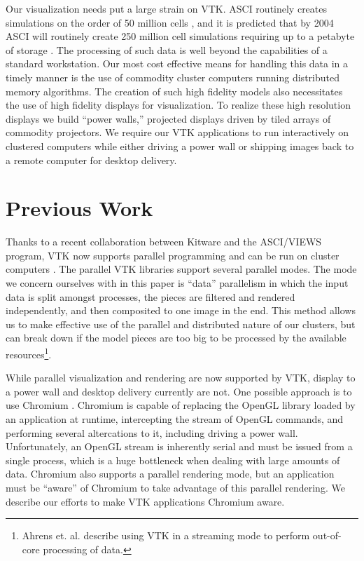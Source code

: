 \documentclass[twocolumn]{article}
\begin{document}
  Our visualization needs put a large strain on VTK.  ASCI routinely
  creates simulations on the order of 50 million cells \cite{Heermann99},
  and it is predicted that by 2004 ASCI will routinely create 250 million
  cell simulations requiring up to a petabyte of storage \cite{Smith98}.
  The processing of such data is well beyond the capabilities of a standard
  workstation.  Our most cost effective means for handling this data in a
  timely manner is the use of commodity cluster computers running
  distributed memory algorithms.  The creation of such high fidelity models
  also necessitates the use of high fidelity displays for visualization.
  To realize these high resolution displays we build ``power walls,''
  projected displays driven by tiled arrays of commodity projectors.  We
  require our VTK applications to run interactively on clustered computers
  while either driving a power wall or shipping images back to a remote
  computer for desktop delivery.


  \section{Previous Work}
  \label{sec:previous_work}

  Thanks to a recent collaboration between Kitware and the ASCI/VIEWS
  program, VTK now supports parallel programming and can be run on cluster
  computers \cite{Ahrens00}.  The parallel VTK libraries support several
  parallel modes.  The mode we concern ourselves with in this paper is
  ``data'' parallelism in which the input data is split amongst processes,
  the pieces are filtered and rendered independently, and then composited
  to one image in the end.  This method allows us to make effective use of
  the parallel and distributed nature of our clusters, but can break down
  if the model pieces are too big to be processed by the available
  resources\footnote{Ahrens et. al. \cite{Ahrens01} describe using VTK in a
  streaming mode to perform out-of-core processing of data.}.

  While parallel visualization and rendering are now supported by VTK,
  display to a power wall and desktop delivery currently are not.  One
  possible approach is to use Chromium \cite{Humphreys02}.  Chromium is
  capable of replacing the OpenGL library loaded by an application at
  runtime, intercepting the stream of OpenGL commands, and performing
  several altercations to it, including driving a power wall.
  Unfortunately, an OpenGL stream is inherently serial and must be issued
  from a single process, which is a huge bottleneck when dealing with large
  amounts of data.  Chromium also supports a parallel rendering mode, but
  an application must be ``aware'' of Chromium to take advantage of this
  parallel rendering.  We describe our efforts to make VTK applications
  Chromium aware.
\end{document}
